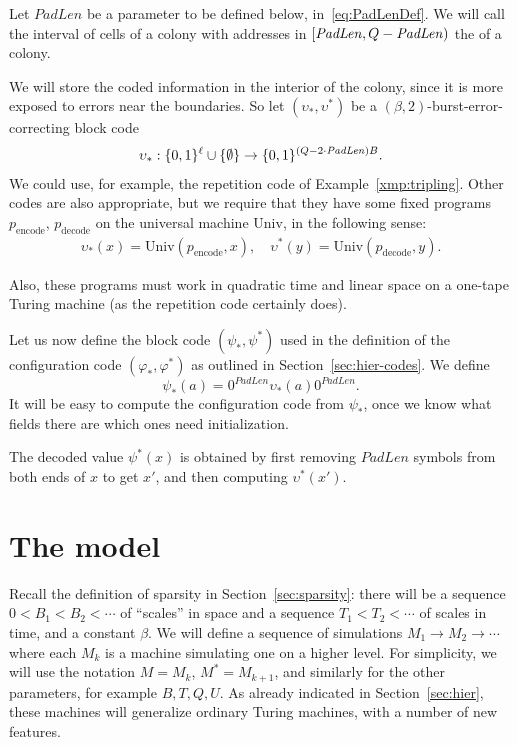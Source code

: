 \documentclass[12pt]{memoir}
\def\B{B}
\def\U{U}
\newcommand{\Tu}{T}
\newcommand{\decode}{\mathrm{decode}}
\newcommand{\encode}{\mathrm{encode}}
\newcommand{\PadLen}{\mathit{PadLen}}
\newcommand{\Un}{\mathrm{Univ}}
\begin{document}
\begin{definition}[Interior]\label{def:interior}
Let \( \PadLen \) be a parameter to be defined below, in~\eqref{eq:PadLenDef}.
We will call the interval of cells of a colony with addresses
in \( \lint{\PadLen}{Q-\PadLen} \) the  of a colony.
\end{definition}

We will store the coded information in the interior of the colony, since it is more exposed 
to errors near the boundaries.
So let \( (\upsilon_{*}, \upsilon^{*}) \) be a \( (\beta,2) \)-burst-error-correcting block code
\begin{align*}
  \upsilon_{*}: \{0,1\}^{\ell} \cup \set{\emptyset}
   \to\{0,1\}^{(Q-2\cdot\PadLen)\B}.
\end{align*}
We could use, for example, the repetition code of Example~\ref{xmp:tripling}.
Other codes are also appropriate, but we require that they have some fixed
programs \( p_{\encode} \), \( p_{\decode} \)
on the universal machine \( \Un \), in the following sense:
 \begin{align*}
   \upsilon_{*}(x)=\Un(p_{\encode},x),\quad
   \upsilon^{*}(y)=\Un(p_{\decode}, y).
 \end{align*}

Also, these programs must work in quadratic time and linear space on a one-tape
Turing machine (as the repetition code certainly does).

Let us now define the block code \( (\psi_*, \psi^*) \) used in the
definition of the configuration code \( (\varphi_*, \varphi^*) \) as 
outlined in Section~\ref{sec:hier-codes}.
We define
\begin{equation}\label{eq:psi}
   \psi_*(a)  = 0^{\PadLen}\upsilon_{*}(a)0^{\PadLen}.
\end{equation}
It will be easy to compute the configuration code from \( \psi_{*} \),
once we know what fields there are which ones need initialization.

The decoded value \( \psi^{*}(x) \) is obtained by first removing \( \PadLen \)
symbols from both ends of \( x \) to get \( x' \), and then computing \(
\upsilon^{*}(x') \).


\section{The model}\label{sec:model}

Recall the definition of sparsity in Section~\ref{sec:sparsity}: there will be 
a sequence \( 0<\B_{1}<\B_{2}<\dotsm \) of ``scales'' in space and a sequence
\( \Tu_{1}<\Tu_{2}<\dotsm \) of scales in time, and a constant \( \beta \).
We will define a sequence of simulations \( M_{1}\to M_{2}\to\dotsm \) where
each \( M_{k} \) is a machine simulating one on a higher level.
For simplicity, we will use the notation \( M=M_{k} \), \( M^{*}=M_{k+1} \),
and similarly for the other parameters, for example \( \B,\Tu, Q, \U \).
As already indicated in Section~\ref{sec:hier}, these machines will generalize
ordinary Turing machines, with a number of new features.
\end{document}
